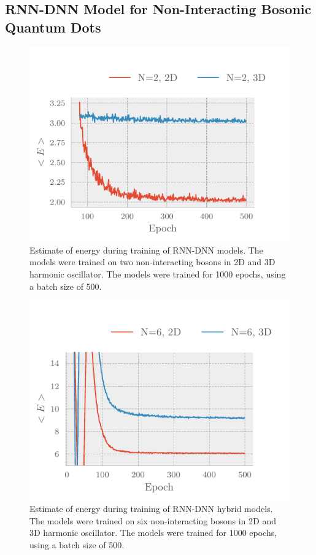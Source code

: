\subsection{RNN-DNN Model for Non-Interacting Bosonic Quantum Dots}
\begin{figure}[H]
	\includegraphics[]{figures/many_part_nonint_training1.pdf}
	\caption{Estimate of energy during training of RNN-DNN models. The models were trained on two non-interacting bosons in 2D and 3D harmonic oscillator. The models were trained for 1000 epochs, using a batch size of 500.}
	\label{fig:many_part_nonint_training1}
\end{figure}

\begin{figure}[H]
	\includegraphics[]{figures/many_part_nonint_training2.pdf}
	\caption{Estimate of energy during training of RNN-DNN hybrid models. The models were trained on six non-interacting bosons in 2D and 3D harmonic oscillator. The models were trained for 1000 epochs, using a batch size of 500.}
	\label{fig:many_part_nonint_training2}
\end{figure}

